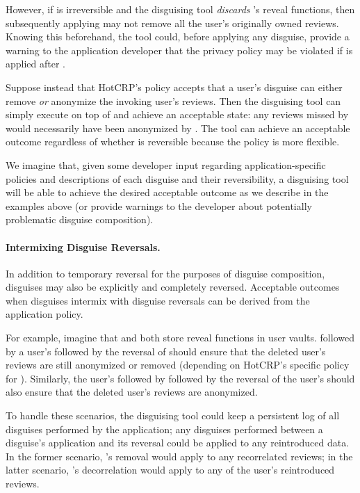 However, if \ca is irreversible and the disguising tool \emph{discards} \ca's reveal functions, then
subsequently applying \gdpr may not remove all the user's originally owned reviews. Knowing this
beforehand, the tool could,
before applying any disguise, provide a warning to the application developer that the privacy policy may be violated if \gdpr is
applied after \ca.

Suppose instead that HotCRP's policy accepts that a user's \gdpr disguise can either remove \emph{or}
anonymize the invoking user's reviews. Then the disguising tool can simply execute \gdpr on top of
\ca and achieve an acceptable state: any reviews missed by \gdpr would necessarily have been
anonymized by \ca.  The tool can achieve an acceptable outcome regardless of whether \ca is
reversible because the policy is more flexible.

We imagine that, given some developer input regarding application-specific policies and descriptions
of each disguise and their reversibility, a disguising tool will be able to achieve the desired acceptable
outcome as we describe in the examples above (or provide warnings to the developer about potentially
problematic disguise composition).

\paragraph{Intermixing Disguise Reversals.}
In addition to temporary reversal for the purposes of disguise composition, disguises may also be
explicitly and completely reversed. 
Acceptable outcomes when disguises intermix with disguise reversals can be derived from the
application policy.

For example, imagine that \ca and \gdpr both store reveal functions in user vaults. 
%
\ca followed by a user's \gdpr followed by the reversal of \ca should ensure that the deleted user's
reviews are still anonymized or removed (depending on HotCRP's specific policy for \gdpr).
Similarly, the user's \gdpr followed by \ca followed by the reversal of the user's \gdpr should also
ensure that the deleted user's reviews are anonymized.

To handle these scenarios, the disguising tool could keep a persistent log of all disguises
performed by the application; any disguises performed between a disguise's application and its
reversal could be applied to any reintroduced data. In the former scenario, \gdpr's removal would
apply to any recorrelated reviews; in the latter scenario, \ca's decorrelation would apply to any of
the user's reintroduced reviews.
